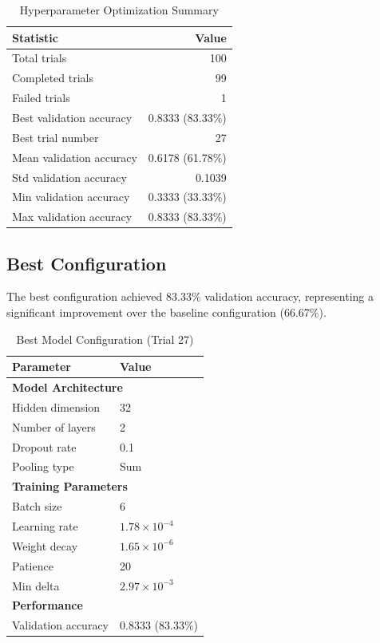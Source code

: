 \documentclass[11pt,a4paper]{article}
\begin{document}
\begin{table}[H]
\centering
\caption{Hyperparameter Optimization Summary}
\begin{tabular}{lr}
\toprule
\textbf{Statistic} & \textbf{Value} \\
\midrule
Total trials & 100 \\
Completed trials & 99 \\
Failed trials & 1 \\
Best validation accuracy & 0.8333 (83.33\%) \\
Best trial number & 27 \\
Mean validation accuracy & 0.6178 (61.78\%) \\
Std validation accuracy & 0.1039 \\
Min validation accuracy & 0.3333 (33.33\%) \\
Max validation accuracy & 0.8333 (83.33\%) \\
\bottomrule
\end{tabular}
\end{table}

\subsection{Best Configuration}

The best configuration achieved 83.33\% validation accuracy, representing a significant improvement over the baseline configuration (66.67\%).

\begin{table}[H]
\centering
\caption{Best Model Configuration (Trial 27)}
\begin{tabular}{ll}
\toprule
\textbf{Parameter} & \textbf{Value} \\
\midrule
\multicolumn{2}{l}{\textbf{Model Architecture}} \\
\midrule
Hidden dimension & 32 \\
Number of layers & 2 \\
Dropout rate & 0.1 \\
Pooling type & Sum \\
\midrule
\multicolumn{2}{l}{\textbf{Training Parameters}} \\
\midrule
Batch size & 6 \\
Learning rate & $1.78 \times 10^{-4}$ \\
Weight decay & $1.65 \times 10^{-6}$ \\
Patience & 20 \\
Min delta & $2.97 \times 10^{-3}$ \\
\midrule
\multicolumn{2}{l}{\textbf{Performance}} \\
\midrule
Validation accuracy & 0.8333 (83.33\%) \\
\bottomrule
\end{tabular}
\end{table}
\end{document}

